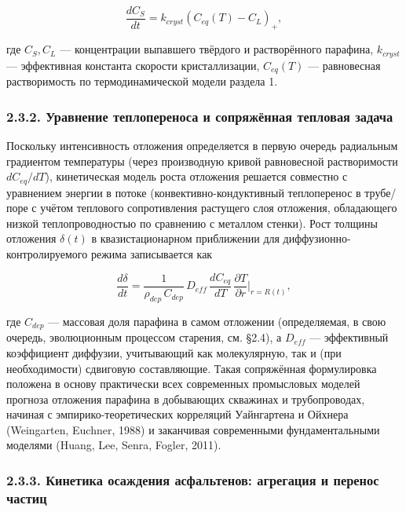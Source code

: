 \documentclass[11pt]{extarticle}
\begin{document}
\[
\frac{dC_{S}}{dt} = k_{cryst}\left(C_{eq}(T) - C_L\right)_+,
\]

где \(C_S, C_L\) --- концентрации выпавшего твёрдого и растворённого парафина, \(k_{cryst}\) --- эффективная константа скорости кристаллизации, \(C_{eq}(T)\) --- равновесная растворимость по термодинамической модели раздела 1.

\subsubsection{2.3.2. Уравнение теплопереноса и сопряжённая тепловая задача}\label{ux443ux440ux430ux432ux43dux435ux43dux438ux435-ux442ux435ux43fux43bux43eux43fux435ux440ux435ux43dux43eux441ux430-ux438-ux441ux43eux43fux440ux44fux436ux451ux43dux43dux430ux44f-ux442ux435ux43fux43bux43eux432ux430ux44f-ux437ux430ux434ux430ux447ux430}

Поскольку интенсивность отложения определяется в первую очередь радиальным градиентом температуры (через производную кривой равновесной растворимости \(dC_{eq}/dT\)), кинетическая модель роста отложения решается совместно с уравнением энергии в потоке (конвективно-кондуктивный теплоперенос в трубе/поре с учётом теплового сопротивления растущего слоя отложения, обладающего низкой теплопроводностью по сравнению с металлом стенки). Рост толщины отложения \(\delta(t)\) в квазистационарном приближении для диффузионно-контролируемого режима записывается как

\[
\frac{d\delta}{dt} = \frac{1}{\rho_{dep}\,C_{dep}}\, D_{eff}\, \frac{dC_{eq}}{dT}\,\frac{\partial T}{\partial r}\bigg|_{r=R(t)},
\]

где \(C_{dep}\) --- массовая доля парафина в самом отложении (определяемая, в свою очередь, эволюционным процессом старения, см. §2.4), а \(D_{eff}\) --- эффективный коэффициент диффузии, учитывающий как молекулярную, так и (при необходимости) сдвиговую составляющие. Такая сопряжённая формулировка положена в основу практически всех современных промысловых моделей прогноза отложения парафина в добывающих скважинах и трубопроводах, начиная с эмпирико-теоретических корреляций Уайнгартена и Ойхнера (Weingarten, Euchner, 1988) и заканчивая современными фундаментальными моделями (Huang, Lee, Senra, Fogler, 2011).

\subsubsection{2.3.3. Кинетика осаждения асфальтенов: агрегация и перенос частиц}\label{ux43aux438ux43dux435ux442ux438ux43aux430-ux43eux441ux430ux436ux434ux435ux43dux438ux44f-ux430ux441ux444ux430ux43bux44cux442ux435ux43dux43eux432-ux430ux433ux440ux435ux433ux430ux446ux438ux44f-ux438-ux43fux435ux440ux435ux43dux43eux441-ux447ux430ux441ux442ux438ux446}
\end{document}
